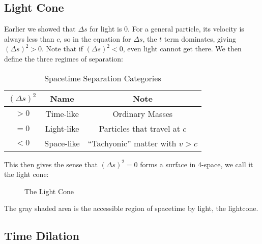 \subsection{Light Cone}
Earlier we showed that $\Delta s$ for light is $0$. For a general particle, its velocity is always less than $c$, so in the equation for $\Delta s$, the $t$ term dominates, giving $(\Delta s)^2>0$. Note that if $(\Delta s)^2<0$, even light cannot get there. We then define the three regimes of separation:
\begin{table}[H]
  \centering
  \begin{tabular}{ccc}
    $(\Delta s)^2$ & Name & Note \\\hline
    $>0$ & Time-like & Ordinary Masses \\
    $=0$ & Light-like & Particles that travel at $c$ \\
    $<0$ & Space-like & ``Tachyonic'' matter with $v>c$
  \end{tabular}
  \caption{Spacetime Separation Categories}
\end{table}
This then gives the sense that $(\Delta s)^2=0$ forms a surface in 4-space, we call it the light cone:
\begin{figure}[H]
  \centering
  \caption{The Light Cone}
\end{figure}
The gray shaded area is the accessible region of spacetime by light, the lightcone.

\subsection{Time Dilation}


